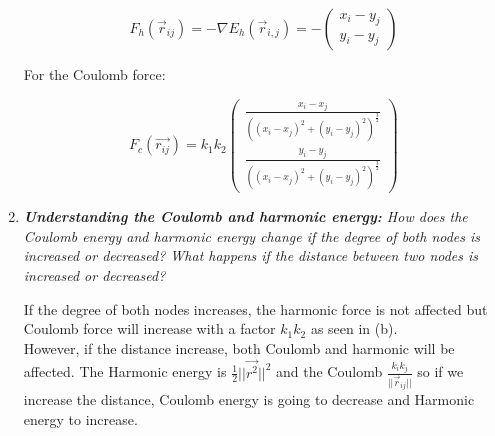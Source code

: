 \documentclass[10pt,a4paper]{article}
\newcommand{\norm}[1]{\left\lVert#1\right\rVert}
\begin{document}
\begin{enumerate}
	
	
	
	


	
	\[ F_{h}(\vec{r}_{ij}) = -\nabla E_{h}(\vec{r}_{i,j})  = -\begin{pmatrix}
	x_i - y_j\\
	y_i - y_j
	\end{pmatrix} \]

	
	For the Coulomb force:
	
	\[F_{c}(\vec{r_{ij}}) = k_1 k_2 \begin{pmatrix}
	\frac{x_i - x_j}{\left( (x_i - x_j)^2 + (y_i - y_j)^2 \right)^{\frac{3}{2}}}\\
	\frac{y_i - y_j}{\left( (x_i - x_j)^2 + (y_i - y_j)^2 \right)^{\frac{3}{2}}}
	\end{pmatrix} \]

	\item \textit{\textbf{Understanding the Coulomb and harmonic energy:} How does the Coulomb energy and harmonic energy change if the degree of both nodes is increased or decreased? What happens if the distance between two nodes is increased or decreased?}
	
			
		If the degree of both nodes increases, the harmonic force is not affected but Coulomb force will increase with a factor $ k_1 k_2 $ as seen in (b). \\
		
		However, if the distance increase, both Coulomb and harmonic will be affected. The Harmonic energy is  $\frac{1}{2}||\vec{r^2}||^2$ and the Coulomb $ \frac{k_i k_j}{||\vec{r}_{ij}||} $ so if we increase the distance, Coulomb energy is going to decrease and Harmonic energy to increase. 
	

\end{enumerate}
\end{document}
